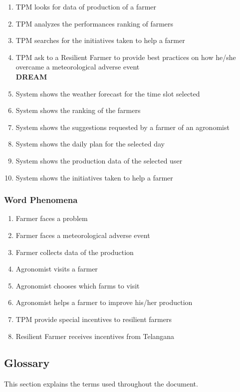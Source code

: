 \begin{enumerate}[label=\textbf{SP.\arabic*}]
    \item TPM looks for data of production of a farmer
    \item TPM analyzes the performances ranking of farmers
    \item TPM searches for the initiatives taken to help a farmer
    \item TPM ask to a Resilient Farmer to provide best practices on how he/she overcame a meteorological adverse event\newline
    \\
\textbf{DREAM}
    \item System shows the weather forecast for the time slot selected
    \item System shows the ranking of the farmers
    \item System shows the suggestions requested by a farmer of an agronomist
    \item System shows the daily plan for the selected day
    \item System shows the production data of the selected user
    \item System shows the initiatives taken to help a farmer
\end{enumerate}

\subsubsection{Word Phenomena}
\begin{enumerate}[label=\textbf{WP.\arabic*}]
    \item Farmer faces a problem
    \item Farmer faces a meteorological adverse event
    \item Farmer collects data of the production
    \item Agronomist visits a farmer
    \item Agronomist chooses which farms to visit
    \item Agronomist helps a farmer to improve his/her production
    \item TPM provide special incentives to resilient farmers
    \item Resilient Farmer receives incentives from Telangana
\end{enumerate}
\newpage
\subsection{Glossary}
This section explains the terms used throughout the document.

